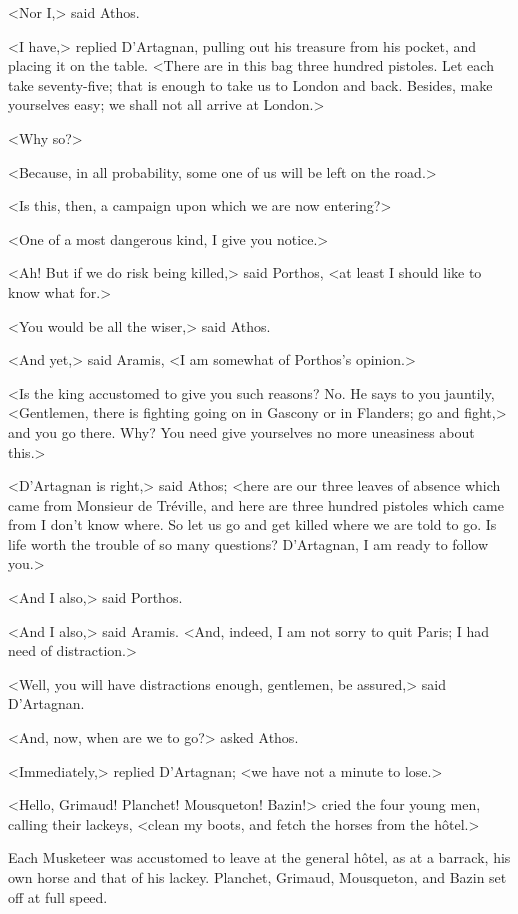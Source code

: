 <Nor I,> said Athos. 

<I have,> replied D'Artagnan, pulling out his treasure from his pocket, and placing it on the table. <There are in this bag three hundred pistoles. Let each take seventy-five; that is enough to take us to London and back. Besides, make yourselves easy; we shall not all arrive at London.> 

<Why so?> 

<Because, in all probability, some one of us will be left on the road.> 

<Is this, then, a campaign upon which we are now entering?> 

<One of a most dangerous kind, I give you notice.> 

<Ah! But if we do risk being killed,> said Porthos, <at least I should like to know what for.> 

<You would be all the wiser,> said Athos. 

<And yet,> said Aramis, <I am somewhat of Porthos's opinion.> 

<Is the king accustomed to give you such reasons? No. He says to you jauntily, <Gentlemen, there is fighting going on in Gascony or in Flanders; go and fight,> and you go there. Why? You need give yourselves no more uneasiness about this.> 

<D'Artagnan is right,> said Athos; <here are our three leaves of absence which came from Monsieur de Tréville, and here are three hundred pistoles which came from I don't know where. So let us go and get killed where we are told to go. Is life worth the trouble of so many questions? D'Artagnan, I am ready to follow you.> 

<And I also,> said Porthos. 

<And I also,> said Aramis. <And, indeed, I am not sorry to quit Paris; I had need of distraction.> 

<Well, you will have distractions enough, gentlemen, be assured,> said D'Artagnan. 

<And, now, when are we to go?> asked Athos. 

<Immediately,> replied D'Artagnan; <we have not a minute to lose.> 

<Hello, Grimaud! Planchet! Mousqueton! Bazin!> cried the four young men, calling their lackeys, <clean my boots, and fetch the horses from the hôtel.> 

Each Musketeer was accustomed to leave at the general hôtel, as at a barrack, his own horse and that of his lackey. Planchet, Grimaud, Mousqueton, and Bazin set off at full speed. 

